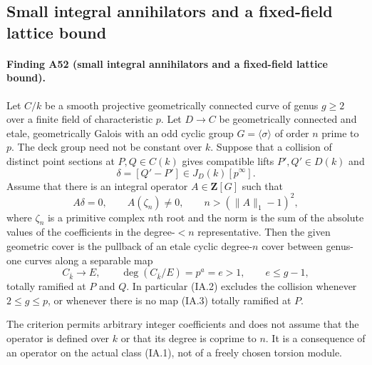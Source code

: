\subsection{Small integral annihilators and a fixed-field lattice bound}
\label{sec:small-integral-annihilator}

\paragraph{Finding A52 (small integral annihilators and a fixed-field lattice bound).}
Let $C/k$ be a smooth projective geometrically connected curve of genus
$g\ge2$ over a finite field of characteristic $p$. Let $D\to C$ be
geometrically connected and etale, geometrically Galois with an odd cyclic
group $G=\langle\sigma\rangle$ of order $n$ prime to $p$. The deck group
need not be constant over $k$. Suppose that a collision of distinct
point sections at $P,Q\in C(k)$ gives compatible lifts
$P',Q'\in D(k)$ and
\[
                  \delta=[Q'-P']\in J_D(k)[p^\infty].
\tag{IA.1}
\]
Assume that there is an integral operator $A\in\mathbf Z[G]$ such that
\[
 A\delta=0,\qquad A(\zeta_n)\ne0,\qquad
 n>(\|A\|_1-1)^2,
\tag{IA.2}
\]
where $\zeta_n$ is a primitive complex $n$th root and the norm is the
sum of the absolute values of the coefficients in the degree-$<n$
representative. Then the given geometric cover is the pullback of an
etale cyclic degree-$n$ cover between genus-one curves along a separable
map
\[
 C_{\bar k}\longrightarrow E,\qquad
 \deg(C_{\bar k}/E)=p^a=e>1,\qquad e\le g-1,
\tag{IA.3}
\]
totally ramified at $P$ and $Q$. In particular (IA.2) excludes the
collision whenever $2\le g\le p$, or whenever there is no map (IA.3)
totally ramified at $P$.

The criterion permits arbitrary integer coefficients and does not
assume that the operator is defined over $k$ or that its degree is
coprime to $n$. It is a consequence of an operator on the actual class
(IA.1), not of a freely chosen torsion module.

